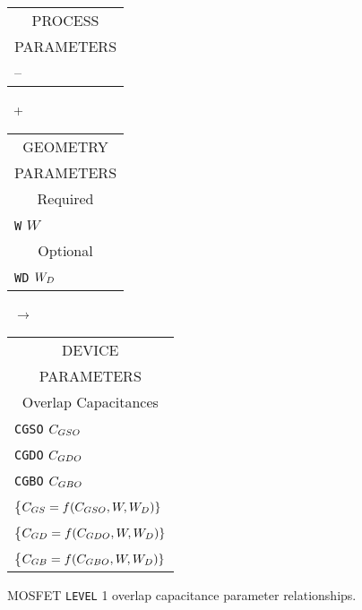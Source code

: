 {\begin{figure}
\parbox[t]{1.3in}{
\begin{tabular}[t]{|p{1in}|}
\hline
\multicolumn{1}{|c|}{PROCESS} \\
\multicolumn{1}{|c|}{PARAMETERS} \\
\hline
\hline
\hspace*{\fill} -- \hspace*{\fill}\\
\hline
\end{tabular}
}
\hfill
\parbox{0.1in}{\ \vspace*{0.2in}\newline +}
\hfill
\begin{tabular}[t]{|p{1in}|}
\hline
\multicolumn{1}{|c|}{GEOMETRY} \\
\multicolumn{1}{|c|}{PARAMETERS} \\
\hline
\hline
\multicolumn{1}{|c|}{Required} \\
\hline
{\tt W} \hfill $W$ \\
\hline
\hline
\multicolumn{1}{|c|}{Optional} \\
\hline
{\tt WD} \hfill $W_D$ \\
\hline
\end{tabular}
\hfill
\parbox{0.1in}{\ \vspace*{0.2in}\newline $\rightarrow$}
\hfill
\begin{tabular}[t]{|p{1.8in}|}
\hline
\multicolumn{1}{|c|}{DEVICE} \\
\multicolumn{1}{|c|}{PARAMETERS} \\
\hline
\hline
\multicolumn{1}{|c|}{Overlap Capacitances}\\
\hline
{\tt CGSO} \hfill $C_{GSO}$\\
{\tt CGDO} \hfill $C_{GDO}$\\
{\tt CGBO} \hfill $C_{GBO}$\\
\hspace*{\fill}\{$C_{GS} = f(C_{GSO}, W, W_D)\}$\\
\hspace*{\fill}\{$C_{GD} = f(C_{GDO}, W, W_D)\}$\\
\hspace*{\fill}\{$C_{GB} = f(C_{GBO}, W, W_D)\}$\\
\hline
\end{tabular}
\caption{ MOSFET {\tt LEVEL} 1 overlap capacitance parameter
relationships. \label{mlevel1overlap}}
\end{figure}}

